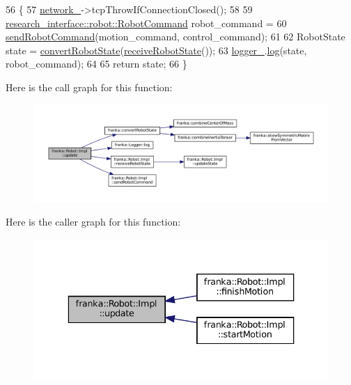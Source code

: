 \begin{DoxyCode}
56                                                                      \{
57   \hyperlink{classfranka_1_1Robot_1_1Impl_acecf3b158ccd1c2ed7e76971f1e6a192}{network\_}->tcpThrowIfConnectionClosed();
58 
59   \hyperlink{structresearch__interface_1_1robot_1_1RobotCommand}{research\_interface::robot::RobotCommand} robot\_command =
60       \hyperlink{classfranka_1_1Robot_1_1Impl_a4c927a26f2a6eceb352ce3af49d28c37}{sendRobotCommand}(motion\_command, control\_command);
61 
62   RobotState state = \hyperlink{namespacefranka_a0eaee201f8afdb02f6530269cb581cbb}{convertRobotState}(\hyperlink{classfranka_1_1Robot_1_1Impl_a15161988fd2644aa2757e196e4488b38}{receiveRobotState}());
63   \hyperlink{classfranka_1_1Robot_1_1Impl_a404078ee04a4786f61d991b71d2dc1ff}{logger\_}.\hyperlink{classfranka_1_1Logger_aee4bfea6a4081c4ed9ee2abd2f62a0cd}{log}(state, robot\_command);
64 
65   \textcolor{keywordflow}{return} state;
66 \}
\end{DoxyCode}
Here is the call graph for this function\+:
\nopagebreak
\begin{figure}[H]
\begin{center}
\leavevmode
\includegraphics[width=350pt]{classfranka_1_1Robot_1_1Impl_a961bcad42d2be61ff56b7004498fa8dd_cgraph}
\end{center}
\end{figure}
Here is the caller graph for this function\+:
\nopagebreak
\begin{figure}[H]
\begin{center}
\leavevmode
\includegraphics[width=336pt]{classfranka_1_1Robot_1_1Impl_a961bcad42d2be61ff56b7004498fa8dd_icgraph}
\end{center}
\end{figure}
\mbox{\label{classfranka_1_1Robot_1_1Impl_a79e762e0bc2fe77fdfe7614963883be7}} 
